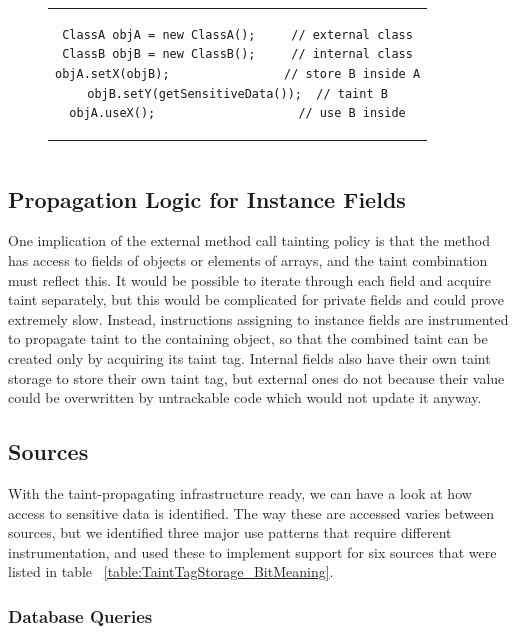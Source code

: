 \documentclass[12pt,twoside,notitlepage]{report}
\begin{document}
\begin{figure}[h]
	\centering
	\begin{tabular}{c}
	\begin{lstlisting}
ClassA objA = new ClassA();     // external class
ClassB objB = new ClassB();     // internal class
objA.setX(objB);                // store B inside A
objB.setY(getSensitiveData());  // taint B
objA.useX();                    // use B inside
	\end{lstlisting}
	\end{tabular}
	\begin{lstlisting}[caption={Example of a propagation logic hole},
	                   label={listing:ExternalMethodCalls_LogicHole}]
	\end{lstlisting}
\end{figure}

\subsection{Propagation Logic for Instance Fields}

One implication of the external method call tainting policy is that the method has access to fields of objects or elements of arrays, and the taint combination must reflect this. It would be possible to iterate through each field and acquire taint separately, but this would be complicated for private fields and could prove extremely slow. Instead, instructions assigning to instance fields are instrumented to propagate taint to the containing object, so that the combined taint can be created only by acquiring its taint tag. Internal fields also have their own taint storage to store their own taint tag, but external ones do not because their value could be overwritten by untrackable code which would not update it anyway.

\subsection{Sources}

With the taint-propagating infrastructure ready, we can have a look at how access to sensitive data is identified. The way these are accessed varies between sources, but we identified three major use patterns that require different instrumentation, and used these to implement support for six sources that were listed in table ~\ref{table:TaintTagStorage_BitMeaning}.

\subsubsection{Database Queries}
\end{document}
